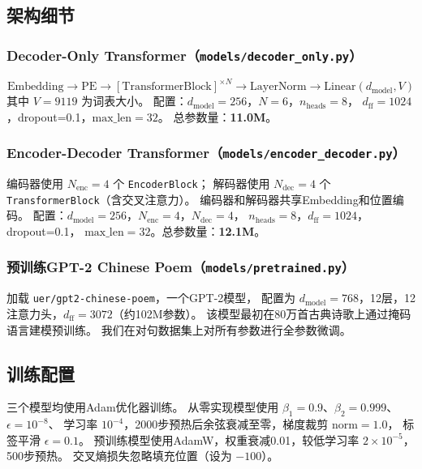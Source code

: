 \documentclass[11pt,a4paper]{article}
\begin{document}
\subsection{架构细节}
\label{sec:architectures}

\subsubsection*{Decoder-Only Transformer（\texttt{models/decoder\_only.py}）}
\[
\text{Embedding} \to \text{PE} \to
    [\text{TransformerBlock}]^{\times N} \to
    \text{LayerNorm} \to \text{Linear}(d_{\text{model}}, V)
\]
其中 \(V = 9119\) 为词表大小。
配置：\(d_{\text{model}}=256\)，\(N=6\)，\(n_{\text{heads}}=8\)，
\(d_{\text{ff}}=1024\)，dropout=0.1，\(\text{max\_len}=32\)。
总参数量：\textbf{11.0M}。

\subsubsection*{Encoder-Decoder Transformer（\texttt{models/encoder\_decoder.py}）}
编码器使用 \(N_{\text{enc}}=4\) 个 \texttt{EncoderBlock}；
解码器使用 \(N_{\text{dec}}=4\) 个 \texttt{TransformerBlock}（含交叉注意力）。
编码器和解码器共享Embedding和位置编码。
配置：\(d_{\text{model}}=256\)，\(N_{\text{enc}}=4\)，\(N_{\text{dec}}=4\)，
\(n_{\text{heads}}=8\)，\(d_{\text{ff}}=1024\)，dropout=0.1，
\(\text{max\_len}=32\)。总参数量：\textbf{12.1M}。

\subsubsection*{预训练GPT-2 Chinese Poem（\texttt{models/pretrained.py}）}
加载 \texttt{uer/gpt2-chinese-poem}，一个GPT-2模型，
配置为 \(d_{\text{model}}=768\)，12层，12注意力头，\(d_{\text{ff}}=3072\)（约102M参数）。
该模型最初在80万首古典诗歌上通过掩码语言建模预训练。
我们在对句数据集上对所有参数进行全参数微调。

\subsection{训练配置}

三个模型均使用Adam优化器训练。
从零实现模型使用 \(\beta_1=0.9\)、\(\beta_2=0.999\)、\(\epsilon=10^{-8}\)、
学习率 \(10^{-4}\)，2000步预热后余弦衰减至零，梯度裁剪 \(\text{norm}=1.0\)，
标签平滑 \(\epsilon=0.1\)。
预训练模型使用AdamW，权重衰减0.01，较低学习率 \(2\times10^{-5}\)，500步预热。
交叉熵损失忽略填充位置（设为 \(-100\)）。
\end{document}
